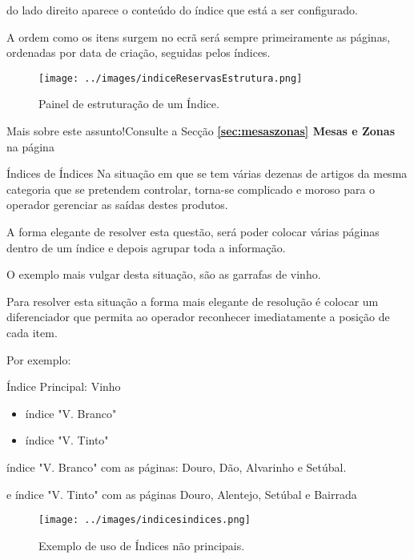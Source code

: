 \documentclass[a4paper,11pt,openany]{memoir}
\newcommand\relacionados{\texttt{[image: ../small-n-flat-master/png/96/file-link.png]}}
\newcommand{\bcrelacionados}[2]{\vspace{5mm}\begin{bclogo}[logo=\relacionados]{\hspace{0.7cm}Mais sobre este assunto!}{#1}\end{bclogo}}
\begin{document}
do lado direito aparece o conteúdo do índice que está a ser configurado.

A ordem como os itens surgem no ecrã será sempre primeiramente as páginas, ordenadas por data de criação, seguidas pelos índices.


\begin{figure}[h]
 \begin{center}
\texttt{[image: ../images/indiceReservasEstrutura.png]}
\caption[Submanifold]{Painel de estruturação de um Índice.}
\label{fig:painelestruturaindice}
\end{center}
\end{figure}

\bcrelacionados{Consulte a Secção \textbf{\ref{sec:mesaszonas} Mesas e Zonas} na página \pageref{sec:mesaszonas}}



\subsection{Índices de Índices}
Na situação em que se tem várias dezenas de artigos da mesma categoria que se pretendem controlar,
torna-se complicado e moroso para o operador gerenciar as saídas destes produtos.


A forma elegante de resolver esta questão, será poder colocar várias páginas dentro de um índice e depois agrupar toda a informação.

O exemplo mais vulgar desta situação, são as garrafas de vinho. 

Para resolver esta situação a forma mais elegante de resolução é colocar um diferenciador que permita 
ao operador reconhecer imediatamente a posição de cada item.

Por exemplo:

Índice Principal: Vinho
\begin{itemize}
\item índice "V. Branco" 
\item índice "V. Tinto"
\end{itemize}

índice "V. Branco" com as páginas: Douro, Dão,  Alvarinho e Setúbal.  

e índice "V. Tinto" com as páginas Douro, Alentejo, Setúbal e Bairrada


\begin{figure}[h]
 \begin{center}
\texttt{[image: ../images/indicesindices.png]}
\caption[Submanifold]{Exemplo de uso de Índices não principais.}
\label{indicesindices}
\end{center}
\end{figure}
\end{document}
